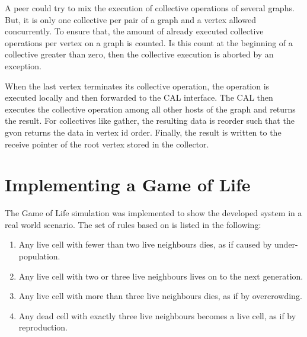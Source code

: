 A peer could try to mix the execution of collective operations of
several graphs. But, it is only one collective per pair of a graph and
a vertex allowed concurrently. To ensure that, the amount of already
executed collective operations per vertex on a graph is counted.  Is
this count at the beginning of a collective greater than zero, then
the collective execution is aborted by an exception.

When the last vertex terminates its collective operation, the
operation is executed locally and then forwarded to the CAL
interface. The CAL then executes the collective operation among all
other hosts of the graph and returns the result. For collectives like
gather, the resulting data is reorder such that the gvon returns the
data in vertex id order. Finally, the result is written to the receive
pointer of the root vertex stored in the collector.



\section{Implementing a Game of Life}
The Game of Life simulation was implemented to show the developed
system in a real world scenario. The set of rules based on \cite{ref:gol_rules}
is listed in the following:

\begin{enumerate}
\item Any live cell with fewer than two live neighbours dies, as if caused by under-population.
\item Any live cell with two or three live neighbours lives on to the next generation.
\item Any live cell with more than three live neighbours dies, as if by overcrowding.
\item Any dead cell with exactly three live neighbours becomes a live cell, as if by reproduction.
\end{enumerate}

